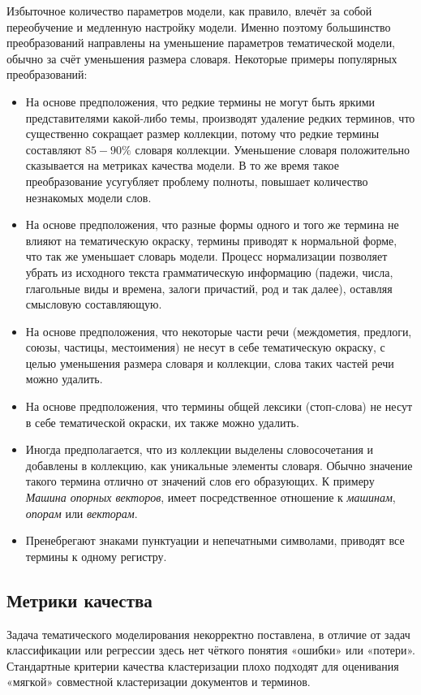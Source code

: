 \documentclass[a4paper, 14pt]{extarticle}
\begin{document}
   	Избыточное количество параметров модели, как правило, влечёт за собой переобучение и медленную настройку модели. Именно поэтому большинство преобразований направлены на уменьшение параметров тематической модели, обычно за счёт уменьшения размера словаря. Некоторые примеры популярных преобразований:
   	\begin{itemize}
   		\item На основе предположения, что редкие термины не могут быть яркими представителями какой-либо темы, производят удаление редких терминов, что существенно сокращает размер коллекции, потому что редкие термины составляют $85-90\%$ словаря коллекции. Уменьшение словаря положительно сказывается на метриках качества модели. В то же время такое преобразование усугубляет проблему полноты, повышает количество незнакомых модели слов. 
   		\item На основе предположения, что разные формы одного и того же термина не влияют на тематическую окраску, термины приводят к нормальной форме, что так же уменьшает словарь модели. Процесс нормализации позволяет убрать из исходного текста грамматическую информацию (падежи, числа, глагольные виды и времена, залоги причастий, род и так далее), оставляя смысловую составляющую.
   		\item На основе  предположения, что некоторые части речи (междометия, предлоги, союзы, частицы, местоимения) не несут в себе тематическую окраску, с целью уменьшения размера словаря и коллекции, слова таких частей речи можно удалить.
   		\item На основе предположения, что термины общей лексики (стоп-слова) не несут в себе тематической окраски, их также можно удалить.
   		\item Иногда предполагается, что из коллекции выделены словосочетания и добавлены в коллекцию, как уникальные элементы словаря. Обычно значение такого термина отлично от значений слов его образующих. К примеру \textit{Машина опорных векторов}, имеет посредственное отношение к \textit{машинам}, \textit{опорам} или \textit{векторам}. 
   		\item Пренебрегают знаками пунктуации и непечатными символами, приводят все термины к одному регистру.
   	\end{itemize}
   	
\subsection{Метрики качества}
	Задача тематического моделирования некорректно поставлена, в отличие от задач классификации или регрессии здесь нет чёткого понятия «ошибки» или «потери». Стандартные критерии качества кластеризации плохо подходят для оценивания «мягкой» совместной кластеризации документов и терминов. 
	
\end{document}
